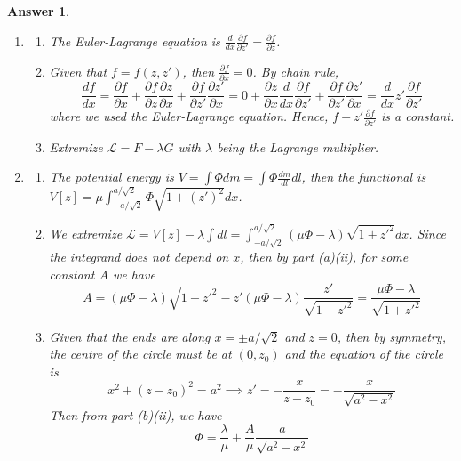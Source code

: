 \documentclass[a4paper]{article}
\newtheorem{ans}{Answer}[section]
\theoremstyle{new}
\begin{document}
\begin{ans}\leavevmode
\begin{enumerate}[label=(\alph*)]
\item
\begin{enumerate}[label=(\roman*)]
\item  The Euler-Lagrange equation is $\frac{d}{dx}\frac{\partial f}{\partial z'}=\frac{\partial f}{\partial z}$.
\item Given that $f=f(z,z')$, then $\frac{\partial f}{\partial x}=0$. By chain rule,
$$\frac{df}{dx}=\frac{\partial f}{\partial x}+\frac{\partial f}{\partial z}\frac{\partial z}{\partial x}+\frac{\partial f}{\partial z'}\frac{\partial z'}{\partial x}=0+\frac{\partial z}{\partial x}\frac{d}{dx}\frac{\partial f}{\partial z'}+\frac{\partial f}{\partial z'}\frac{\partial z'}{\partial x}=\frac{d}{dx}z'\frac{\partial f}{\partial z'}$$
where we used the Euler-Lagrange equation. Hence, $f-z'\frac{\partial f}{\partial z'}$ is a constant.
\item Extremize $\mathcal{L}=F-\lambda G$ with $\lambda$ being the Lagrange multiplier.
\end{enumerate}
\item
\begin{enumerate}[label=(\roman*)]
\item
The potential energy is $V=\int\Phi dm=\int\Phi\frac{dm}{dl}dl$, then the functional is 
$V[z]=\mu\int_{-a/\sqrt{2}}^{a/\sqrt{2}}\Phi\sqrt{1+(z')^2}dx$.
\item We extremize $\mathcal{L}=V[z]-\lambda\int dl=\int_{-a/\sqrt{2}}^{a/\sqrt{2}}(\mu\Phi-\lambda)\sqrt{1+z'^2}dx$. 
Since the integrand does not depend on $x$, then by part (a)(ii), for some constant $A$ we have
$$A=(\mu\Phi-\lambda)\sqrt{1+z'^2}-z'(\mu\Phi-\lambda)\frac{z'}{\sqrt{1+z'^2}}=\frac{\mu\Phi-\lambda}{\sqrt{1+z'^2}}$$
\item Given that the ends are along $x=\pm a/\sqrt{2}$ and $z=0$, then by symmetry, the centre of the circle must be at $(0,z_0)$ and the equation of the circle is
$$x^2+(z-z_0)^2=a^2\implies z'=-\frac{x}{z-z_0}=-\frac{x}{\sqrt{a^2-x^2}}$$
Then from part (b)(ii), we have
$$\Phi=\frac{\lambda}{\mu}+\frac{A}{\mu}\frac{a}{\sqrt{a^2-x^2}}$$
\end{enumerate}
\end{enumerate}
\end{ans}
\newpage
\end{document}
